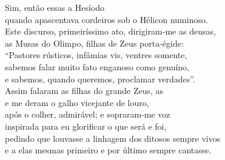\begin{pages}
\begin{Rightside}
\quad{}Sim, então essas a Hesíodo \\
quando apascentava cordeiros sob o Hélicon numinoso.\\
Este discurso, primeiríssimo ato, dirigiram-me as deusas,\\
as Musas do Olimpo, filhas de Zeus porta-égide: \\
``Pastores rústicos, infâmias vis, ventres somente,\\
sabemos falar muito fato enganoso como genuíno,\\
e sabemos, quando queremos, proclamar verdades''.\\
Assim falaram as filhas do grande Zeus, as \\
e me deram o  galho vicejante de louro, \\
após o colher, admirável; e sopraram-me voz\\
inspirada para eu glorificar o que será e foi,\\
pedindo que louvasse a linhagem dos ditosos sempre vivos\\
e a elas mesmas primeiro e por último sempre cantasse.\\


\end{Rightside}
\end{pages}
